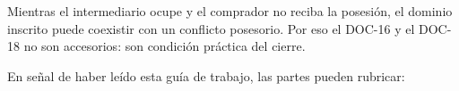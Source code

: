 \documentclass[12pt,a4paper]{article}
\begin{document}
Mientras el intermediario ocupe y el comprador no reciba la posesión, el dominio inscrito puede coexistir con un conflicto posesorio. Por eso el DOC-16 y el DOC-18 no son accesorios: son condición práctica del cierre.

\LugarFecha
\noindent En señal de haber leído esta guía de trabajo, las partes pueden rubricar:

\vspace{0.6em}
\end{document}
